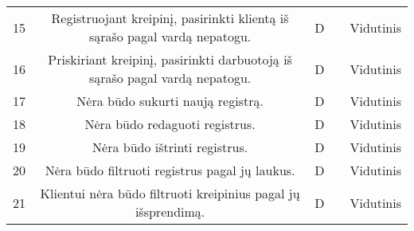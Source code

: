 \begin{table}[ht]
\begin{tabular}{c c c c c}
	15 & Registruojant kreipinį, pasirinkti klientą iš sąrašo pagal vardą nepatogu. & D & & Vidutinis\\%
	16 & Priskiriant kreipinį, pasirinkti darbuotoją iš sąrašo pagal vardą nepatogu. & D & & Vidutinis\\%
	17 & Nėra būdo sukurti naują registrą. & D & & Vidutinis\\%
	18 & Nėra būdo redaguoti registrus. & D & & Vidutinis\\%
	19 & Nėra būdo ištrinti registrus. & D & & Vidutinis\\%
	20 & Nėra būdo filtruoti registrus pagal jų laukus. & D & & Vidutinis\\%
	21 & Klientui nėra būdo filtruoti kreipinius pagal jų išsprendimą. & D & & Vidutinis\\%
	\hline %
	\end{tabular} 
	\label{table:nonlin} %
	\end{table} 
